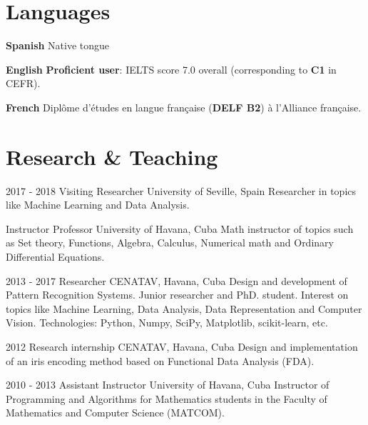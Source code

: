 \documentclass[]{friggeri-cv}
\begin{document}
\section{Languages}
\begin{entrylist}
  \entry
    {\textbf{Spanish}}
    {}
    {}
    {Native tongue}

  \entry
    {\textbf{English}}
    {}
    {}
    {
      \textbf{Proficient user}: IELTS score 7.0 overall (corresponding to \textbf{C1} in CEFR).
    }

  \entry
    {\textbf{French}}
    {}
    {}
    {Diplôme d'études en langue française (\textbf{DELF B2}) à l'Alliance française.}
\end{entrylist}

\section{Research \& Teaching}
\begin{entrylist}
  \entry
    {2017 - 2018}
    {Visiting Researcher}
    {University of Seville, Spain}
    {Researcher in topics like Machine Learning and Data Analysis.\\}

  \entry
    {}
    {Instructor Professor}
    {University of Havana, Cuba}
    {Math instructor of topics such as Set theory, Functions, Algebra, Calculus, Numerical math and Ordinary Differential Equations.\\}

  \entry
    {2013 - 2017}
    {Researcher}
    {CENATAV, Havana, Cuba}
    {Design and development of Pattern Recognition Systems. Junior researcher and PhD. student. Interest on topics like Machine Learning, Data Analysis, Data Representation and Computer Vision. Technologies: Python, Numpy, SciPy, Matplotlib, scikit-learn, etc.\\}

  \entry
    {2012}
    {Research internship}
    {CENATAV, Havana, Cuba}
    {Design and implementation of an iris encoding method based on Functional Data Analysis (FDA).\\}
  \end{entrylist}

\begin{entrylist}
  \entry
    {2010 - 2013}
    {Assistant Instructor}
    {University of Havana, Cuba}
    {Instructor of Programming and Algorithms for Mathematics students in the Faculty of Mathematics and Computer Science (MATCOM).\\}
\end{entrylist}
\end{document}
